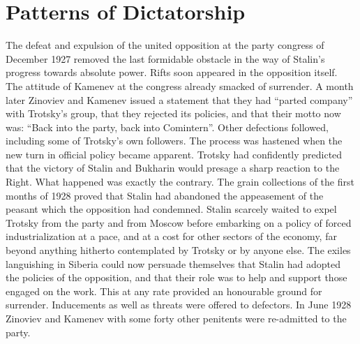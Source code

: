 \chapter{Patterns of Dictatorship}

The defeat and expulsion of the united opposition at the party congress of December 1927 removed the last formidable obstacle in the way of Stalin's progress towards absolute power. Rifts soon appeared in the opposition itself. The attitude of Kamenev at the congress already smacked of surrender. A month later Zinoviev and Kamenev issued a statement that they had ``parted company'' with Trotsky's group, that they rejected its policies, and that their motto now was: ``Back into the party, back into Comintern''. Other defections followed, including some of Trotsky's own followers. The process was hastened when the new turn in official policy became apparent. Trotsky had confidently predicted that the victory of Stalin and Bukharin would presage a sharp reaction to the Right. What happened was exactly the contrary. The grain collections of the first months of 1928 proved that Stalin had abandoned the appeasement of the peasant which the opposition had condemned. Stalin scarcely waited to expel Trotsky from the party and from Moscow before embarking on a policy of forced industrialization at a pace, and at a cost for other sectors of the economy, far beyond anything hitherto contemplated by Trotsky or by anyone else. The exiles languishing in Siberia could now persuade themselves that Stalin had adopted the policies of the opposition, and that their role was to help and support those engaged on the work. This at any rate provided an honourable ground for surrender. Inducements as well as threats were offered to defectors. In June 1928 Zinoviev and Kamenev with some forty other penitents were re-admitted to the party. 

